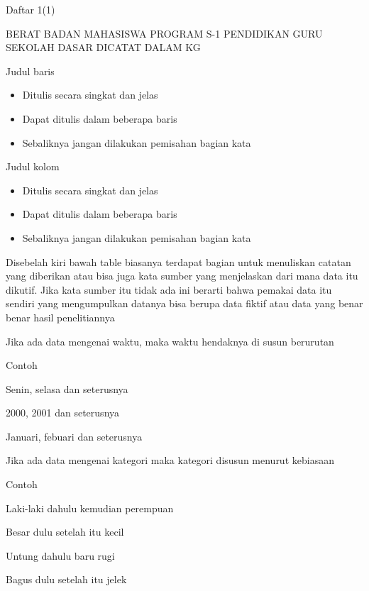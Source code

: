 \noindent Daftar 1(1)\par


\noindent BERAT BADAN MAHASISWA PROGRAM S-1 PENDIDIKAN GURU SEKOLAH DASAR DICATAT DALAM KG\par


\noindent Judul baris\par

\begin{itemize}
	\item Ditulis secara singkat dan jelas \par

	\item Dapat ditulis dalam beberapa baris\par

	\item Sebaliknya jangan dilakukan pemisahan bagian kata
\end{itemize}\par


\noindent Judul kolom\par

\begin{itemize}
	\item Ditulis secara singkat dan jelas\par

	\item Dapat ditulis dalam beberapa baris\par

	\item Sebaliknya jangan dilakukan pemisahan bagian kata
\end{itemize}\par

Disebelah kiri bawah table biasanya terdapat bagian untuk menuliskan catatan yang diberikan atau bisa juga kata sumber yang menjelaskan dari mana data itu dikutif. Jika kata sumber itu tidak ada ini berarti bahwa pemakai data itu sendiri yang mengumpulkan datanya bisa berupa data fiktif atau data yang benar benar hasil penelitiannya\par


 Jika ada data mengenai waktu, maka waktu hendaknya di susun berurutan\par


\noindent Contoh\par

Senin, selasa dan seterusnya\par

2000, 2001 dan seterusnya\par

Januari, febuari dan seterusnya\par



 Jika ada data mengenai kategori maka kategori disusun menurut kebiasaan\par


\noindent Contoh\par

Laki-laki dahulu kemudian perempuan\par

Besar dulu setelah itu kecil\par

Untung dahulu baru rugi \par

Bagus dulu setelah itu jelek\par
